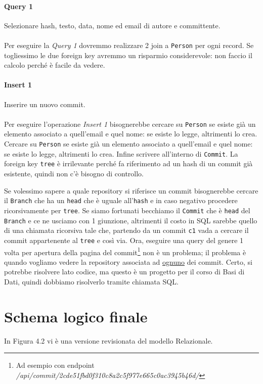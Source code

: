 \paragraph{Query 1} Selezionare hash, testo, data, nome ed email di autore e committente.\\\\\noindent
Per eseguire la \textit{Query 1} dovremmo realizzare 2 join a \verb|Person| per ogni record. Se togliessimo le due foreign key avremmo un risparmio considerevole: non faccio il calcolo perché è facile da vedere.
\paragraph{Insert 1} Inserire un nuovo commit.\\\\\noindent
Per eseguire l'operazione \textit{Insert 1} bisognerebbe cercare su \verb|Person| se esiste già un elemento associato a quell'email e quel nome: se esiste lo legge, altrimenti lo crea. Cercare su \verb|Person| se esiste già un elemento associato a quell'email e quel nome: se esiste lo legge, altrimenti lo crea. Infine scrivere all'interno di \verb|Commit|. La foreign key \verb|tree| è irrilevante perché fa riferimento ad un hash di un commit già esistente, quindi non c'è bisogno di controllo.

Se volessimo sapere a quale repository si riferisce un commit bisognerebbe cercare il \verb|Branch| che ha un \verb|head| che è uguale all'\verb|hash| e in caso negativo procedere ricorsivamente per \verb|tree|. Se siamo fortunati becchiamo il \verb|Commit| che è \verb|head| del \verb|Branch| e ce ne usciamo con 1 giunzione, altrimenti il costo in SQL sarebbe quello di una chiamata ricorsiva tale che, partendo da un commit \verb|c1| vada a cercare il commit appartenente al \verb|tree| e così via. Ora, eseguire una query del genere 1 volta per apertura della pagina del commit\footnote{Ad esempio con endpoint \textit{/api/commit/2cde51fbd0f310c8a2c5f977e665c0ac3945b46d/}} non è un problema; il problema è quando vogliamo vedere la repository associata ad \underline{ognuno} dei commit. Certo, si potrebbe risolvere lato codice, ma questo è un progetto per il corso di Basi di Dati, quindi dobbiamo risolverlo tramite chiamata SQL.

\section{Schema logico finale}
In Figura 4.2 vi è una versione revisionata del modello Relazionale.

